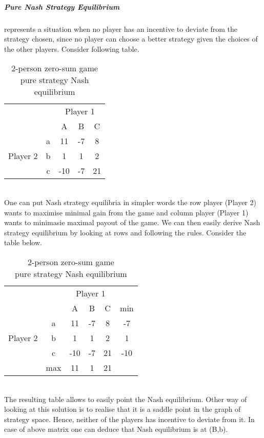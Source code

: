 \documentclass[10pt, a4paper]{report}
\begin{document}
\subparagraph{Pure Nash Strategy Equilibrium} represents a situation when no player has an incentive to deviate from the strategy chosen, since no player can choose a better strategy given the choices of the other players. Consider following table.
\begin{table}[ht!]
	\hspace{-4em}
	\centering
	\begin{tabular}{ccccc|}
		& & \multicolumn{3}{c}{Player 1}                                  \\ \cline{3-5}
		& & A & B & \multicolumn{1}{c}{C}                                 \\ \cline{3-5}
		\multirow{3}{*}{Player 2} & \multicolumn{1}{|c|}{a} & 11 & -7 & 8 \\
		& \multicolumn{1}{|c|}{b} & 1 & 1 & 2                             \\
		& \multicolumn{1}{|c|}{c} & -10 & -7 & 21                         \\ \cline{3-5}
	\end{tabular}
	\caption{2-person zero-sum game\\ pure strategy Nash equilibrium}
\end{table}
\\
One can put Nash strategy equilibria in simpler words the row player (Player 2) wants to maximise minimal gain from the game and column player (Player 1) wants to minimasie maximal payout of the game. We can then easily derive Nash strategy equilibrium by looking at rows and following the rules. Consider the table below.
\begin{table}[ht!]
	\hspace{-4em}
	\centering
	\begin{tabular}{ccccc|c}
		& & \multicolumn{3}{c}{Player 1} &                                     \\ \cline{3-5}
		& & A & B & \multicolumn{1}{c}{C} & min                                \\ \cline{3-5}
		\multirow{3}{*}{Player 2} & \multicolumn{1}{|c|}{a} & 11 & -7 & 8 & -7 \\
		& \multicolumn{1}{|c|}{b} & 1 & 1 & 2 & 1                              \\
		& \multicolumn{1}{|c|}{c} & -10 & -7 & 21 & -10                        \\ \cline{3-5}
		& max & 11 & 1 & \multicolumn{1}{c}{21} &
	\end{tabular}
	\caption{2-person zero-sum game\\ pure strategy Nash equilibrium}
\end{table}
\\
The resulting table allows to easily point the Nash equilibrium. Other way of looking at this solution is to realise that it is a saddle point in the graph of strategy space. Hence, neither of the players has incentive to deviate from it. In case of above matrix one can deduce that Nash equilibrium is at (B,b).
\end{document}
